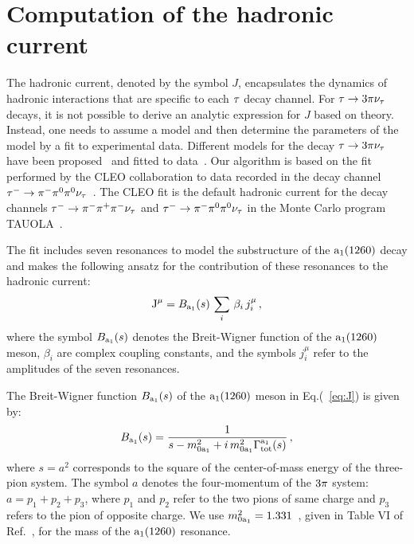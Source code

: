 \section{Computation of the hadronic current}
\label{sec:HadronicCurrent}

The hadronic current, denoted by the symbol $J$, encapsulates the dynamics of hadronic interactions that are specific to each $\tau$ decay channel.
For $\tau \to 3 \pi\nu_{\tau}$ decays,
it is not possible to derive an analytic expression for $J$ based on theory.
Instead, one needs to assume a model and then determine the parameters of the model by a fit to experimental data.
Different models for the decay $\tau \to 3 \pi\nu_{\tau}$ have been proposed~\cite{Bowler:1988kf,Isgur:1988vm,Kuhn:1990ad,Feindt:1990ev,Kuhn:1992nz,Ecker:1988te,Ecker:1989yg,Dumm:2009va} and fitted to data~\cite{ARGUS:1992olh,OPAL:1997was,DELPHI:1998bhv,Shekhovtsova:2012ra,Nugent:2013hxa}.
Our algorithm is based on the fit performed by the CLEO collaboration to data recorded in the decay channel $\tau^{-} \to \pi^{-}\pi^{\textrm{0}}\pi^{\textrm{0}}\nu_{\tau}$~\cite{CLEO:1999rzk}.
The CLEO fit is the default hadronic current for the decay channels $\tau^{-} \to \pi^{-}\pi^{+}\pi^{-}\nu_{\tau}$ and $\tau^{-} \to \pi^{-}\pi^{\textrm{0}}\pi^{\textrm{0}}\nu_{\tau}$ in the Monte Carlo program \textsc{TAUOLA}~\cite{Jadach:1990mz}. 

The fit includes seven resonances to model the substructure of the $\textrm{a}_{1}\textrm{(1260)}$ decay and makes the following ansatz for the contribution of these resonances to the hadronic current:
\begin{equation}
\textrm{J}^{\mu} = B_{\textrm{a}_{1}}(s) \, \sum_{i} \, \beta_{i} \, j_{i}^{\mu} \, ,
\label{eq:J}
\end{equation}
where the symbol $B_{\textrm{a}_{1}}(s)$ denotes the Breit-Wigner function of the $\textrm{a}_{1}\textrm{(1260)}$ meson, $\beta_{i}$ are complex coupling constants, and the symbols $j_{i}^{\mu}$ refer to the amplitudes of the seven resonances.

The Breit-Wigner function $B_{\textrm{a}_{1}}(s)$ of the $\textrm{a}_{1}\textrm{(1260)}$ meson in Eq.(~\ref{eq:J}) is given by:
\begin{equation}
B_{\textrm{a}_{1}}(s) = \frac{1}{s - m_{0\textrm{a}_{1}}^{2} + i \, m_{0\textrm{a}_{1}}^{2} \Gamma_{\textrm{tot}}^{\textrm{a}_{1}}(s)} \, ,
\label{eq:Ba1}
\end{equation}
where $s = a^{2}$ corresponds to the square of the center-of-mass energy of the three-pion system.
The symbol $a$ denotes the four-momentum of the $3 \pi$ system: $a = p_{1} + p_{2} + p_{3}$,
where $p_{1}$ and $p_{2}$ refer to the two pions of same charge and $p_{3}$ refers to the pion of opposite charge.
We use $m_{0\textrm{a}_{1}}^{2} = 1.331$~\GeV, given in Table VI of Ref.~\cite{CLEO:1999rzk}, for the mass of the $\textrm{a}_{1}\textrm{(1260)}$ resonance.

